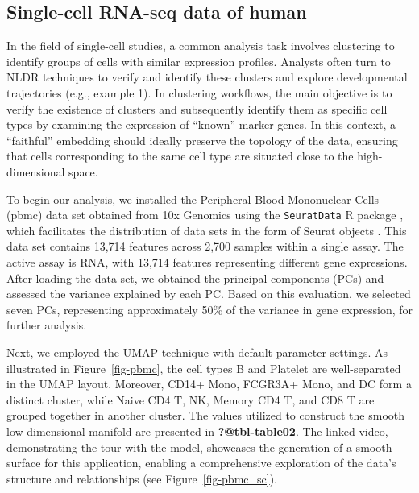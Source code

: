 \documentclass[
  12pt]{article}
\begin{document}
\hypertarget{single-cell-rna-seq-data-of-human}{%
\subsection{Single-cell RNA-seq data of
human}\label{single-cell-rna-seq-data-of-human}}

In the field of single-cell studies, a common analysis task involves
clustering to identify groups of cells with similar expression profiles.
Analysts often turn to NLDR techniques to verify and identify these
clusters and explore developmental trajectories (e.g., example 1). In
clustering workflows, the main objective is to verify the existence of
clusters and subsequently identify them as specific cell types by
examining the expression of ``known'' marker genes. In this context, a
``faithful'' embedding should ideally preserve the topology of the data,
ensuring that cells corresponding to the same cell type are situated
close to the high-dimensional space.

To begin our analysis, we installed the Peripheral Blood Mononuclear
Cells (pbmc) data set obtained from 10x Genomics using the
\texttt{SeuratData} R package \citep{Rahul2019}, which facilitates the
distribution of data sets in the form of Seurat objects
\citep{Yuhan2021}. This data set contains 13,714 features across 2,700
samples within a single assay. The active assay is RNA, with 13,714
features representing different gene expressions. After loading the data
set, we obtained the principal components (PCs) and assessed the
variance explained by each PC. Based on this evaluation, we selected
seven PCs, representing approximately 50\% of the variance in gene
expression, for further analysis.

Next, we employed the UMAP technique with default parameter settings. As
illustrated in Figure~\ref{fig-pbmc}, the cell types B and Platelet are
well-separated in the UMAP layout. Moreover, CD14+ Mono, FCGR3A+ Mono,
and DC form a distinct cluster, while Naive CD4 T, NK, Memory CD4 T, and
CD8 T are grouped together in another cluster. The values utilized to
construct the smooth low-dimensional manifold are presented in
\textbf{?@tbl-table02}. The linked video, demonstrating the tour with
the model, showcases the generation of a smooth surface for this
application, enabling a comprehensive exploration of the data's
structure and relationships (see Figure~\ref{fig-pbmc_sc}).
\end{document}
